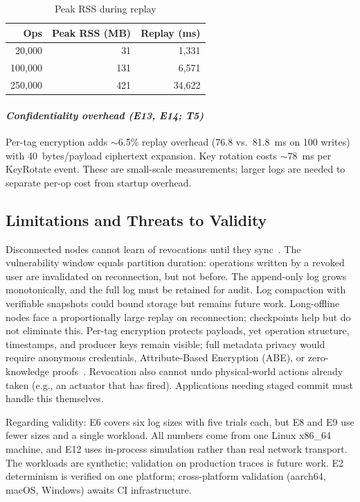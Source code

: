 \documentclass[10pt,journal,compsoc]{IEEEtran}
\begin{document}
\begin{table}[!htbp]
\centering
\caption{Peak RSS during replay}
\label{tab:e9-memory}
\begin{tabular}{@{}rrr@{}}
\toprule
\textbf{Ops} & \textbf{Peak RSS (MB)} & \textbf{Replay (ms)} \\
\midrule
20,000  & 31   & 1,331  \\
100,000 & 131  & 6,571  \\
250,000 & 421  & 34,622 \\
\bottomrule
\end{tabular}
\end{table}

\paragraph*{\textit{Confidentiality overhead (E13, E14; T5)}}
Per-tag encryption adds $\sim$6.5\% replay overhead (76.8 vs.\ 81.8~ms on 100 writes) with 40~bytes/payload ciphertext expansion. Key rotation costs $\sim$78~ms per KeyRotate event. These are small-scale measurements; larger logs are needed to separate per-op cost from startup overhead.


\subsection{Limitations and Threats to Validity}\label{subsec:limitations}

Disconnected nodes cannot learn of revocations until they sync~\cite{10.1007/978-3-030-01950-1_48}. The vulnerability window equals partition duration: operations written by a revoked user are invalidated on reconnection, but not before. The append-only log grows monotonically, and the full log must be retained for audit. Log compaction with verifiable snapshots could bound storage but remains future work. Long-offline nodes face a proportionally large replay on reconnection; checkpoints help but do not eliminate this. Per-tag encryption protects payloads, yet operation structure, timestamps, and producer keys remain visible; full metadata privacy would require anonymous credentials, Attribute-Based Encryption (ABE), or zero-knowledge proofs~\cite{8888155,zhang2020attribute}. Revocation also cannot undo physical-world actions already taken (e.g., an actuator that has fired). Applications needing staged commit must handle this themselves.

Regarding validity: E6 covers six log sizes with five trials each, but E8 and E9 use fewer sizes and a single workload. All numbers come from one Linux x86\_64 machine, and E12 uses in-process simulation rather than real network transport. The workloads are synthetic; validation on production traces is future work. E2 determinism is verified on one platform; cross-platform validation (aarch64, macOS, Windows) awaits CI infrastructure.
\end{document}
